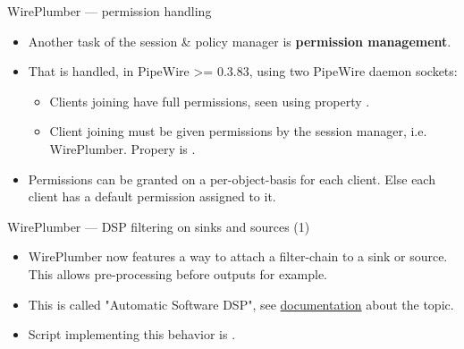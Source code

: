 \begin{frame}{WirePlumber — permission handling}
  \begin{itemize}

  \item Another task of the session \& policy manager is \textbf{permission
    management}.

  \item That is handled, in PipeWire >= 0.3.83, using two PipeWire daemon sockets:

    \begin{itemize}
    \item Clients joining  have full permissions, seen
      using property .
    \item Client joining  must be given permissions by the
      session manager, i.e. WirePlumber. Propery  is
      .
    \end{itemize}

  \item Permissions can be granted on a per-object-basis for each client. Else
    each client has a default permission assigned to it.

  \end{itemize}
\end{frame}



\begin{frame}{WirePlumber — DSP filtering on sinks and sources (1)}
  \begin{itemize}

  \item WirePlumber now features a way to attach a filter-chain to a sink or
    source. This allows pre-processing before outputs for example.

  \item This is called "Automatic Software DSP", see
    \href{https://pipewire.pages.freedesktop.org/wireplumber/policies/software_dsp.html}{documentation}
    about the topic.

  \item Script implementing this behavior is .

  \end{itemize}
\end{frame}



